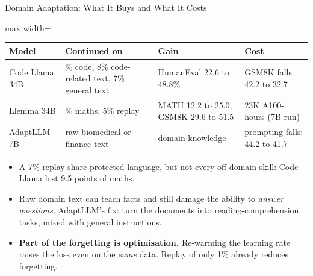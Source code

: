 \begin{frame}{Domain Adaptation: What It Buys and What It Costs}
    \begin{center}
    \small
    \begin{adjustbox}{max width=\linewidth}\begin{tabular}{l>{\raggedright\arraybackslash}p{3.5cm}>{\raggedright\arraybackslash}p{3.4cm}>{\raggedright\arraybackslash}p{3.1cm}}
        \toprule
        \textbf{Model} & \textbf{Continued on} & \textbf{Gain} & \textbf{Cost} \\
        \midrule
        Code Llama 34B & 85\% code, 8\% code-related text, 7\% general text & HumanEval 22.6 to 48.8\% & GSM8K falls 42.2 to 32.7 \\
        Llemma 34B & 95\% maths, 5\% replay & MATH 12.2 to 25.0, GSM8K 29.6 to 51.5 & 23K A100-hours (7B run) \\
        AdaptLLM 7B & raw biomedical or finance text & domain knowledge & prompting \alert{falls}: 44.2 to 41.7 \\
        \bottomrule
    \end{tabular}\end{adjustbox}
    \end{center}
    \begin{itemize}\small\itemsep0.2em
        \item A 7\% replay share protected language, but not every off-domain skill: Code Llama lost 9.5 points of maths.
        \item Raw domain text can teach facts and still damage the ability to \emph{answer questions}. AdaptLLM's fix: turn the documents into reading-comprehension tasks, mixed with general instructions.
        \item \textbf{Part of the forgetting is optimisation.} Re-warming the learning rate raises the loss even on the \emph{same} data. Replay of only 1\% already reduces forgetting.
    \end{itemize}
\end{frame}

